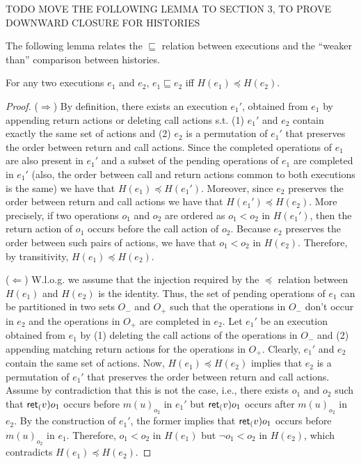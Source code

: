 TODO MOVE THE FOLLOWING LEMMA TO SECTION 3, TO PROVE DOWNWARD CLOSURE FOR HISTORIES

The following lemma relates the $\sqsubseteq$ relation between executions 
and the ``weaker than'' comparison between histories.

\begin{lemma}
  \label{lemma:exec_hist}

     For any two executions $e_1$ and $e_2$, $e_1\sqsubseteq e_2$ iff $H(e_1)\preceq H(e_2)$.

\end{lemma}

\begin{proof}

($\Rightarrow$) By definition,
there exists an execution $e_1'$, obtained from $e_1$ by appending 
return actions or deleting call actions s.t. (1) $e_1'$ and $e_2$ contain exactly
the same set of actions and (2) $e_2$ is a permutation of $e_1'$ that preserves the order between 
return and call actions. 
Since the completed operations of $e_1$ are also present in $e_1'$ and a subset of the pending operations of $e_1$
are completed in $e_1'$ (also, the order between call and return actions common to both executions is the same)
we have that $H(e_1)\preceq H(e_1')$. Moreover, since $e_2$ preserves the order between return and call actions
we have that $H(e_1')\preceq H(e_2)$. More precisely, if two operations $o_1$ and $o_2$ are ordered as $o_1<o_2$ in $H(e_1')$,
then the return action of $o_1$ occurs before the call action of $o_2$. Because $e_2$ preserves the order between such pairs
of actions, we have that $o_1<o_2$ in $H(e_2)$. Therefore, by transitivity, $H(e_1)\preceq H(e_2)$.

($\Leftarrow$) W.l.o.g. we assume that the injection required by the $\preceq$ relation
  between $H(e_1)$ and $H(e_2)$ is the identity.
  Thus, the set of pending operations of $e_1$ can be partitioned in 
  two sets $O_{-}$ and $O_{+}$ such that the operations in $O_{-}$ don't occur in $e_2$ and the operations in 
  $O_{+}$ are completed in $e_2$. Let $e_1'$ be an execution obtained from $e_1$ by 
  (1) deleting the call actions of the operations in $O_{-}$
  and (2) appending matching return actions for the operations in $O_+$. 
  Clearly, $e_1'$ and $e_2$ contain the same set of actions. Now, $H(e_1)\preceq H(e_2)$ implies that 
  $e_2$ is a permutation of $e_1'$ that preserves the order between return and call actions. Assume by contradiction
  that this is not the case, i.e., there exists $o_1$ and $o_2$ such that ${\mathsf{ret}_{(}}v){o_1}$ occurs before $m(u)_{o_2}$ in $e_1'$ 
  but ${\mathsf{ret}_{(}}v){o_1}$ occurs after $m(u)_{o_2}$ in $e_2$. By the construction of $e_1'$, the former implies that 
  ${\mathsf{ret}_{(}}v){o_1}$ occurs before $m(u)_{o_2}$ in $e_1$. Therefore, $o_1<o_2$ in $H(e_1)$ but $\neg o_1<o_2$ in $H(e_2)$,
  which contradicts $H(e_1)\preceq H(e_2)$.
 
\end{proof}

